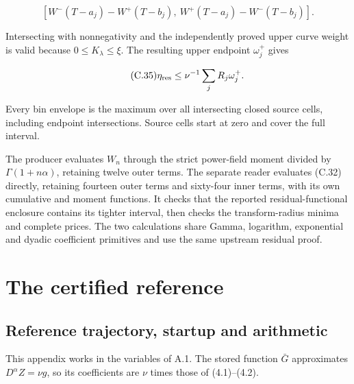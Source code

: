 \documentclass[11pt,a4paper]{article}
\begin{document}
\begin{equation*}\tag{C.34}
\left[
W^-(T-a_j)-W^+(T-b_j),\
W^+(T-a_j)-W^-(T-b_j)
\right].
\end{equation*}

Intersecting with nonnegativity and the independently proved upper curve weight is valid because \(0\le K_\lambda\le\xi\). The resulting upper endpoint \(\omega_j^+\) gives

\begin{equation*}\tag{C.35}
\eta_{\rm res}\le\nu^{-1}\sum_jR_j\omega_j^+.
\end{equation*}

Every bin envelope is the maximum over all intersecting closed source cells, including endpoint intersections. Source cells start at zero and cover the full interval.

The producer evaluates \(W_n\) through the strict power-field moment divided by \(\Gamma(1+n\alpha)\), retaining twelve outer terms. The separate reader evaluates (C.32) directly, retaining fourteen outer terms and sixty-four inner terms, with its own cumulative and moment functions. It checks that the reported residual-functional enclosure contains its tighter interval, then checks the transform-radius minima and complete prices. The two calculations share Gamma, logarithm, exponential and dyadic coefficient primitives and use the same upstream residual proof.

\setcounter{section}{3}\section{The certified reference}

\setcounter{subsection}{0}\subsection{Reference trajectory, startup and arithmetic}

This appendix works in the variables of A.1. The stored function \(\bar G\) approximates \(D^\alpha Z=\nu g\), so its coefficients are \(\nu\) times those of (4.1)–(4.2).
\end{document}
